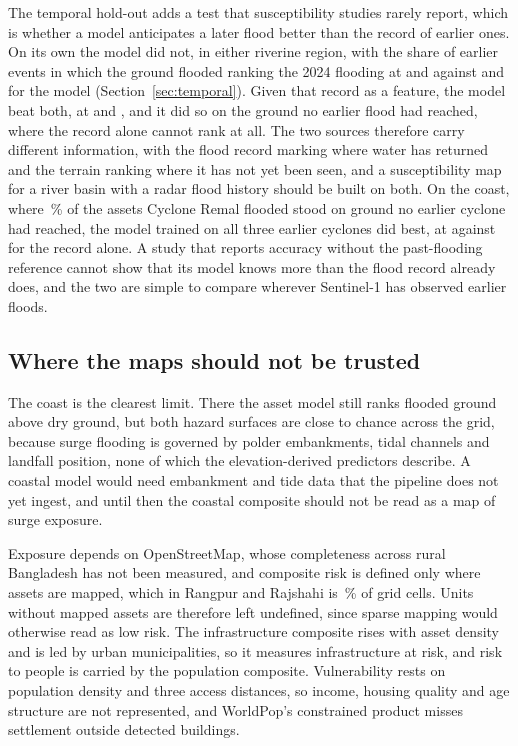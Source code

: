The temporal hold-out adds a test that susceptibility studies rarely report, which is whether a model anticipates a later flood better than the record of earlier ones. On its own the model did not, in either riverine region, with the share of earlier events in which the ground flooded ranking the 2024 flooding at \RRTempPastAUC{} and \SylhetTempPastAUC{} against \RRTempAUC{} and \SylhetTempAUC{} for the model (Section~\ref{sec:temporal}). Given that record as a feature, the model beat both, at \RRPastFeatAUC{} and \SylhetPastFeatAUC{}, and it did so on the ground no earlier flood had reached, where the record alone cannot rank at all. The two sources therefore carry different information, with the flood record marking where water has returned and the terrain ranking where it has not yet been seen, and a susceptibility map for a river basin with a radar flood history should be built on both. On the coast, where \CoastalPastFeatUnseenPos{}\,\% of the assets Cyclone Remal flooded stood on ground no earlier cyclone had reached, the model trained on all three earlier cyclones did best, at \CoastalTempAUC{} against \CoastalTempPastAUC{} for the record alone. A study that reports accuracy without the past-flooding reference cannot show that its model knows more than the flood record already does, and the two are simple to compare wherever Sentinel-1 has observed earlier floods.

\subsection{Where the maps should not be trusted}

The coast is the clearest limit. There the asset model still ranks flooded ground above dry ground, but both hazard surfaces are close to chance across the grid, because surge flooding is governed by polder embankments, tidal channels and landfall position, none of which the elevation-derived predictors describe. A coastal model would need embankment and tide data that the pipeline does not yet ingest, and until then the coastal composite should not be read as a map of surge exposure.

Exposure depends on OpenStreetMap, whose completeness across rural Bangladesh has not been measured, and composite risk is defined only where assets are mapped, which in Rangpur and Rajshahi is \RRMappedCellShare{}\,\% of grid cells. Units without mapped assets are therefore left undefined, since sparse mapping would otherwise read as low risk. The infrastructure composite rises with asset density and is led by urban municipalities, so it measures infrastructure at risk, and risk to people is carried by the population composite. Vulnerability rests on population density and three access distances, so income, housing quality and age structure are not represented, and WorldPop's constrained product misses settlement outside detected buildings.

